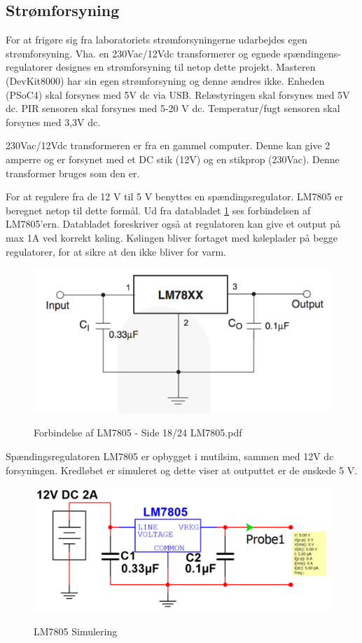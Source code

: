 \subsection{Strømforsyning}

For at frigøre sig fra laboratoriets strømforsyningerne udarbejdes egen strømforsyning. Vha. en 230Vac/12Vdc transformerer og egnede spændingens-regulatorer designes en strømforsyning til netop dette projekt. Masteren (DevKit8000) har sin egen strømforsyning og denne ændres ikke. Enheden (PSoC4) skal forsynes med 5V dc via USB. Relæstyringen skal forsynes med 5V dc. PIR sensoren skal forsynes med 5-20 V dc. Temperatur/fugt sensoren skal forsynes med 3,3V dc. 

230Vac/12Vdc transformeren er fra en gammel computer. Denne kan give 2 amperre og er forsynet med et DC stik (12V) og en stikprop (230Vac). Denne transformer bruges som den er. 

For at regulere fra de 12 V til 5 V benyttes en spændingsregulator. LM7805 er beregnet netop til dette formål. Ud fra databladet \ref{lab:LM7805} ses forbindelsen af LM7805'ern. Databladet foreskriver også at regulatoren kan give et output på max 1A ved korrekt køling. Kølingen bliver fortaget med køleplader på begge regulatorer, for at sikre at den ikke bliver for varm. 

\begin{figure}[H] \centering
{\includegraphics[width=\textwidth]{filer/design/Billeder/LM7805_DATASHEET}}
\caption{Forbindelse af LM7805 - Side 18/24 LM7805.pdf}
\label{lab:LM7805}
\raggedright
\end{figure}

Spændingsregulatoren LM7805 er opbygget i mutilsim, sammen med 12V dc forsyningen. Kredløbet er simuleret og dette viser at outputtet er de ønskede 5 V.

\begin{figure}[H] \centering
{\includegraphics[width=\textwidth]{filer/design/Billeder/LM7805_SIMULATION}}
\caption{LM7805 Simulering}
\label{lab:LM7805_SIMULERING}
\raggedright
\end{figure}


